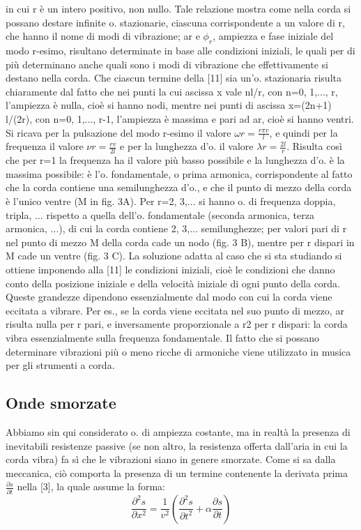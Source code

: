 \documentclass[a4paper]{article}
\begin{document}
in cui r è un intero positivo, non nullo. Tale relazione mostra come nella corda si possano destare infinite o. stazionarie, ciascuna corrispondente a un valore di r, che hanno il nome di modi di vibrazione; ar e $\phi_r$, ampiezza e fase iniziale del modo r-esimo, risultano determinate in base alle condizioni iniziali, le quali per di più determinano anche quali sono i modi di vibrazione che effettivamente si destano nella corda. Che ciascun termine della [11] sia un'o. stazionaria risulta chiaramente dal fatto che nei punti la cui ascissa x vale nl/r, con n=0, 1,..., r, l'ampiezza è nulla, cioè si hanno nodi, mentre nei punti di ascissa x=(2n+1) l/(2r), con n=0, 1,..., r-1, l'ampiezza è massima e pari ad ar, cioè si hanno ventri. Si ricava per la pulsazione del modo r-esimo il valore $\omega r=\frac{r\pi v}{l}$, e quindi per la frequenza il valore $\nu r=\frac{rv}{2l}$ e per la lunghezza d'o. il valore $\lambda r=\frac{2l}{r}$. 
Risulta così che per r=1 la frequenza ha il valore più basso possibile e la lunghezza d'o. è la massima possibile: è l'o. fondamentale, o prima armonica, corrispondente al fatto che la corda contiene una semilunghezza d'o., e che il punto di mezzo della corda è l'unico ventre (M in fig. 3A). Per r=2, 3,... si hanno o. di frequenza doppia, tripla, ... rispetto a quella dell'o. fondamentale (seconda armonica, terza armonica, ...), di cui la corda contiene 2, 3,... semilunghezze; per valori pari di r nel punto di mezzo M della corda cade un nodo (fig. 3 B), mentre per r dispari in M cade un ventre (fig. 3 C). La soluzione adatta al caso che si sta studiando si ottiene imponendo alla [11] le condizioni iniziali, cioè le condizioni che danno conto della posizione iniziale e della velocità iniziale di ogni punto della corda. Queste grandezze dipendono essenzialmente dal modo con cui la corda viene eccitata a vibrare. Per es., se la corda viene eccitata nel suo punto di mezzo, ar risulta nulla per r pari, e inversamente proporzionale a r2 per r dispari: la corda vibra essenzialmente sulla frequenza fondamentale. Il fatto che si possano determinare vibrazioni più o meno ricche di armoniche viene utilizzato in musica per gli strumenti a corda. 

\subsection{Onde smorzate} 
Abbiamo sin qui considerato o. di ampiezza costante, ma in realtà la presenza di inevitabili resistenze passive (se non altro, la resistenza offerta dall'aria in cui la corda vibra) fa sì che le vibrazioni siano in genere smorzate. Come si sa dalla meccanica, ciò comporta la presenza di un termine contenente la derivata prima $\frac{\partial s}{\partial t}$ nella [3], la quale assume la forma: 
\begin{equation}
\frac{\partial^2 s}{\partial x^2}=\frac{1}{v^2}(\frac{\partial^2 s}{\partial t^2}+\alpha\frac{\partial s}{\partial t})
\end{equation}
\end{document}
